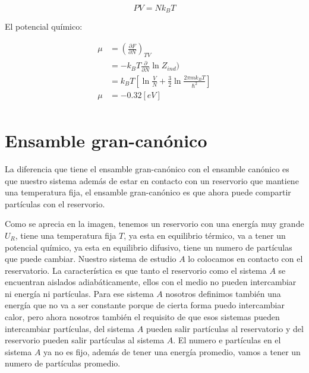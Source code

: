 \documentclass[11pt,fleqn]{book}
\begin{document}
\begin{equation*}
    PV=Nk_{B}T
\end{equation*}

El potencial químico:

\begin{equation}
    \begin{split}
    \mu&=\left(\frac{\partial F}{\partial N}\right)_{TV}\\
    &= -k_{B}T\frac{\partial}{\partial N}\ln{Z_{ind}})\\
    &=k_{B}T\left[\ln{\frac{V}{N}}+\frac{3}{2}\ln{\frac{2\pi mk_{B}T}{\hslash^{2}}}\right]\\
    \mu&=-0.32[eV]\\
    \end{split}
    \label{Eq. 4.87}
\end{equation}





\chapter{Ensamble gran-canónico}

La diferencia que tiene el ensamble gran-canónico con el ensamble canónico es que nuestro sistema además de estar en contacto con un reservorio que mantiene una temperatura fija, el ensamble gran-canónico es que ahora puede compartir partículas con el reservorio.



Como se aprecia en la imagen, tenemos un reservorio con una energía muy grande $U_{R}$, tiene una temperatura fija $T$, ya esta en equilibrio térmico, va a tener un potencial químico, ya esta en equilibrio difusivo, tiene un numero de partículas que puede cambiar. Nuestro sistema de estudio $A$ lo colocamos en contacto con el reservatorio. La característica es que tanto el reservorio como el sistema $A$ se encuentran aislados adiabáticamente, ellos con el medio no pueden intercambiar ni energía ni partículas. Para ese sistema $A$ nosotros definimos también una energía que no va a ser constante porque de cierta forma puedo intercambiar calor, pero ahora nosotros también el requisito de que esos sistemas pueden intercambiar partículas, del sistema $A$ pueden salir partículas al reservatorio y del reservorio pueden salir partículas al sistema $A$. El numero e partículas en el sistema $A$ ya no es fijo, además de tener una energía promedio, vamos a tener un numero de partículas promedio.\\
 
\end{document}
